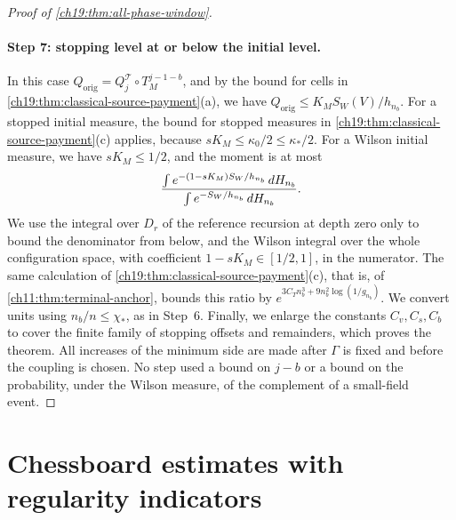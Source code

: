 \begin{proof}[Proof of \cref{ch19:thm:all-phase-window}]
\paragraph{Step 7: stopping level at or below the initial level.}
In this case $Q_{\mathrm{orig}}=Q_j^{\mathcal T}\circ T_M^{j-1-b}$, and by the bound for cells in \cref{ch19:thm:classical-source-payment}(a), we have $Q_{\mathrm{orig}}\le K_MS_W(V)/h_{n_b}$. For a stopped initial measure, the bound for stopped measures in \cref{ch19:thm:classical-source-payment}(c) applies, because $sK_M\le\kappa_0/2\le\kappa_*/2$. For a Wilson initial measure, we have $sK_M\le1/2$, and the moment is at most
\[
 \frac{\int e^{-(1-sK_M)S_W/h_{n_b}}\,dH_{n_b}}{\int e^{-S_W/h_{n_b}}\,dH_{n_b}}.
\]
We use the integral over $D_r$ of the reference recursion at depth zero only to bound the denominator from below, and the Wilson integral over the whole configuration space, with coefficient $1-sK_M\in[1/2,1]$, in the numerator. The same calculation of \cref{ch19:thm:classical-source-payment}(c), that is, of \cref{ch11:thm:terminal-anchor}, bounds this ratio by $e^{3C_Tn_b^3+9n_b^2\log(1/g_{n_b})}$. We convert units using $n_b/n\le\chi_*$, as in Step~6. Finally, we enlarge the constants $C_v,C_s,C_b$ to cover the finite family of stopping offsets and remainders, which proves the theorem. All increases of the minimum side are made after $\Gamma$ is fixed and before the coupling is chosen. No step used a bound on $j-b$ or a bound on the probability, under the Wilson measure, of the complement of a small-field event.
\end{proof}

\section{Chessboard estimates with regularity indicators}\label{ch19:sec:chessboard}

